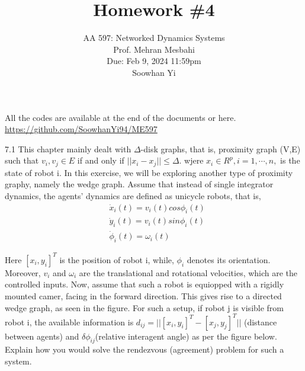 \documentclass{article}
\begin{document}
\setcounter{problem}{0}
\title{Homework \#4}
\author{
    \normalsize{AA 597: Networked Dynamics Systems}\\
    \normalsize{Prof. Mehran Mesbahi}\\
    \normalsize{Due: Feb 9, 2024 11:59pm}\\
    \normalsize{Soowhan Yi}
}
\date{{}}
\maketitle

All the codes are available at the end of the documents or here.
\url{https://github.com/SoowhanYi94/ME597}
\begin{problem}7.1
    This chapter mainly dealt with $\Delta$-disk graphs, that is, proximity graph (V,E) such that ${v_i, v_j} \in E$ if and only if $||x_i - x_j|| \leq \Delta$. wjere $x_i \in R^p, i = 1, \cdots, n, $ is the state of robot i. In this exercise, we will be exploring another type of proximity graphy, namely the wedge graph. Assume that instead of single integrator dynamics, the agents' dynamics are defined as unicycle robots, that is, 
    \begin{align*}
        &\dot x_i(t) = v_i(t) cos{\phi_i (t)}\\
        &\dot y_i(t) = v_i(t) sin{\phi_i (t)}\\
        &\dot \phi_i(t)= \omega_i(t)
    \end{align*}
    
    Here $[x_i, y_i]^T$ is the position of robot i, while, $\phi_i$ denotes its orientation. Moreover, $v_i$ and $\omega_i$ are the translational and rotational velocities, which are the controlled inputs. Now, assume that such a robot is equiopped with a rigidly mounted camer, facing in the forward direction. This gives rise to a directed wedge graph, as seen in the figure. For such a setup, if robot j is visible from robot i, the available information is $d_{ij} = ||[x_i, y_i]^T - [x_j, y_j]^T||$ (distance between agents) and $\delta \phi_{ij}$(relative interagent angle) as per the figure below. Explain how you would solve the rendezvous (agreement) problem for such a system. 
    

\end{problem}
\end{document}
